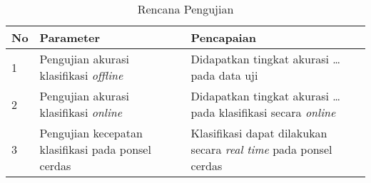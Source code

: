 \begin{table}[h!]
    \centering
    \caption{Rencana Pengujian}
    \begin{tabular}{ |p{0.5cm}|p{5cm}|p{7.5cm}| }
        \hline
        \textbf{No} & \textbf{Parameter} & \textbf{Pencapaian} \\

        \hline
        1 & Pengujian akurasi klasifikasi \textit{offline} & Didapatkan tingkat akurasi \dots pada data uji  \\

        \hline
        2 & Pengujian akurasi klasifikasi \textit{online} & Didapatkan tingkat akurasi \dots pada klasifikasi secara \textit{online}\\
        
        \hline
        3 & Pengujian kecepatan klasifikasi pada ponsel cerdas & Klasifikasi dapat dilakukan secara \textit{real time} pada ponsel cerdas \\

        \hline
    \end{tabular}
    \label{table:rencana-pengujian}
\end{table}
